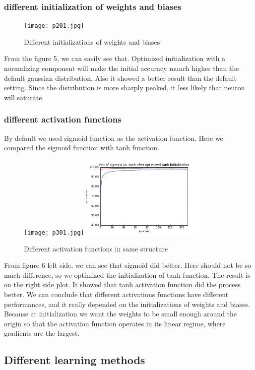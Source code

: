 \documentclass[12pt,a4paper]{article}
\begin{document}
\subsubsection{different initialization of weights and biases}
\begin{figure}
\centering
\texttt{[image: p201.jpg]}
\caption{Different initializations of weights and biases}
\end{figure}
From the figure 5, we can easily see that. Optimized initialization with a normalizing component will make the initial accuracy munch higher than the default gaussian distribution. Also it showed a better result than the default setting. Since the distribution is more sharply peaked, it less likely that neuron will saturate.
\subsubsection{different activation functions}
By default we used sigmoid function as the activation function. Here we compared the sigmoid function with tanh function.\\
\begin{figure}
\centering
\texttt{[image: p301.jpg]}
\includegraphics[width=60mm,scale=1]{p302.jpg}
\caption{Different activation functions in same structure}
\end{figure}
From figure 6 left side, we can see that sigmoid did better. Here should not be so much difference, so we optimized the initialization of tanh function. The result is on the right side plot. It showed that tanh activation function did the process better. We can conclude that different activations functions have different performances, and it really depended on the initializations of weights and biases. Because at initialization we want the weights to be small enough around the origin so that the activation function operates in its linear regime, where gradients are the largest.

\subsection{Different learning methods}
\end{document}
